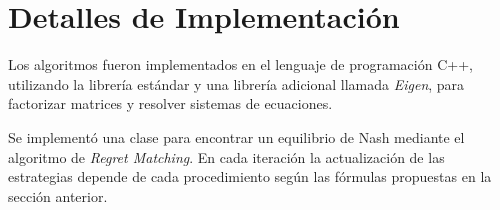 \section{Detalles de Implementación}

Los algoritmos fueron implementados en el lenguaje de programación C++, utilizando la librería estándar y una librería adicional llamada \textit{Eigen}, para factorizar matrices y resolver sistemas de ecuaciones.

Se implementó una clase para encontrar un equilibrio de Nash mediante el algoritmo de \textit{Regret Matching}. En cada iteración la actualización de las estrategias depende de cada procedimiento según las fórmulas propuestas en la sección anterior.







